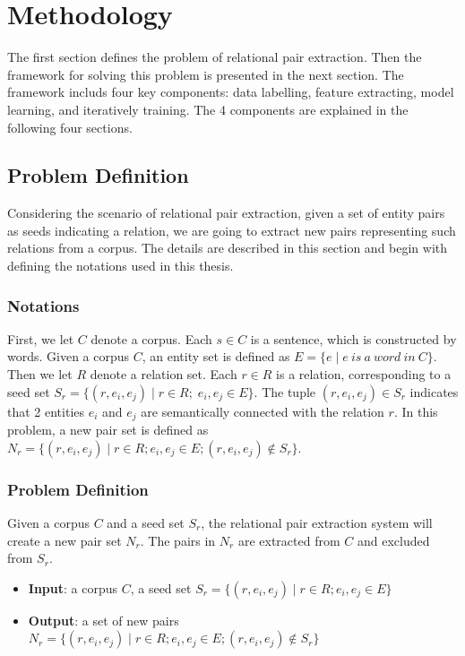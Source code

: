 \chapter{Methodology}
\label{ch:method}
The first section defines the problem of relational pair extraction.
Then the framework for solving this problem is presented in the next section.
The framework includs four key components: data labelling, feature extracting, model learning, and iteratively training.
The 4 components are explained in the following four sections.

\section{Problem Definition}
Considering the scenario of relational pair extraction, given a set of entity pairs as seeds indicating a relation, we are going to extract new pairs representing such relations from a corpus.
The details are described in this section and begin with defining the notations used in this thesis.

\subsection{Notations}
First, we let $C$ denote a corpus.
Each $s \in C$ is a sentence, which is constructed by words.
Given a corpus $C$, an entity set is defined as $E=\{e \mid e\ is\ a\ word\ in\ C\}$.
Then we let $R$ denote a relation set.
Each $r \in R$ is a relation, corresponding to a seed set $S_r=\{(r,e_i,e_j) \mid r\in R; \; e_i, e_j \in E\}$.
The tuple $(r,e_i,e_j)\in S_r$ indicates that 2 entities $e_i$ and $e_j$ are semantically connected with the relation $r$.
In this problem, a new pair set is defined as $N_r=\{(r,e_i,e_j) \mid r\in R;e_i,e_j\in E;(r,e_i,e_j)\notin S_r\}$.

\subsection{Problem Definition}
Given a corpus $C$ and a seed set $S_r$, the relational pair extraction system will create a new pair set $N_r$.
The pairs in $N_r$ are extracted from $C$ and excluded from $S_r$.

\begin{itemize}
\item \textbf{Input}: a corpus $C$, a seed set $S_r=\{(r,e_i,e_j) \mid r\in R; e_i,e_j\in E\}$
\item \textbf{Output}: a set of new pairs $N_r=\{(r,e_i,e_j) \mid r\in R;e_i,e_j\in E;(r,e_i,e_j)\notin S_r\}$ 
\end{itemize}

